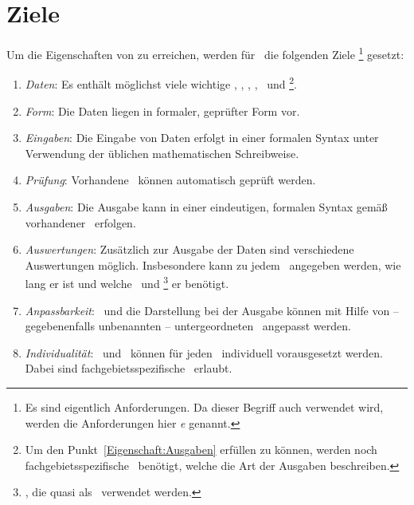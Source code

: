 \section{Ziele}%
\label{sec:Ziele}

Um die Eigenschaften von  zu erreichen, werden für \ASBA\ die folgenden Ziele%
\footnote{%
	Es sind eigentlich Anforderungen.
	Da dieser Begriff auch  verwendet wird, werden die Anforderungen hier \emph{e} genannt.
}
gesetzt:
\begin{enumerate}
	\item \label{Ziel:Daten} \emph{Daten}:
	Es enthält möglichst viele wichtige \Axiome, \Saetze, \Beweise, \Fachbegriffe, \Fachgebiete\ und \Ausgabeschemata%
	\footnote{%
		Um den Punkt~\ref{Eigenschaft:Ausgaben}  erfüllen zu können, werden noch fachgebietsspezifische \Ausgabeschemata\ benötigt, welche die Art der Ausgaben beschreiben.
	}.
	\item \label{Ziel:Form} \emph{Form}:
	Die Daten liegen in formaler, geprüfter Form vor.
	\item \label{Ziel:Eingaben} \emph{Eingaben}:
	Die Eingabe von Daten erfolgt in einer formalen Syntax unter Verwendung der üblichen mathematischen Schreibweise.
	\item \label{Ziel:Prüfung} \emph{Prüfung}:
	Vorhandene \Beweise\ können automatisch geprüft werden.
	\item \label{Ziel:Ausgaben} \emph{Ausgaben}:
	Die Ausgabe kann in einer eindeutigen, formalen Syntax gemäß vorhandener \Ausgabeschemata\ erfolgen.
	\item \label{Ziel:Auswertungen} \emph{Auswertungen}:
	Zusätzlich zur Ausgabe der Daten sind verschiedene Auswertungen möglich.
	Insbesondere kann zu jedem \Beweis\ angegeben werden, wie lang er ist und welche \Axiome\ und \Saetze%
	\footnote{
		\Saetze, die quasi als \Axiome\ verwendet werden.
	}
	er benötigt.
	\item \label{Ziel:Anpassbarkeit} \emph{Anpassbarkeit}:
	\Fachbegriffe\ und die Darstellung bei der Ausgabe können mit Hilfe von -- gegebenenfalls unbenannten -- untergeordneten \Fachgebieten\ angepasst werden.
	\item \label{Ziel:Individualität} \emph{Individualität}:
	\Axiome\ und \Saetze\ können für jeden \Beweis\ individuell vorausgesetzt werden.
	Dabei sind fachgebietsspezifische \Fachbegriffe\ erlaubt.

\end{enumerate}
